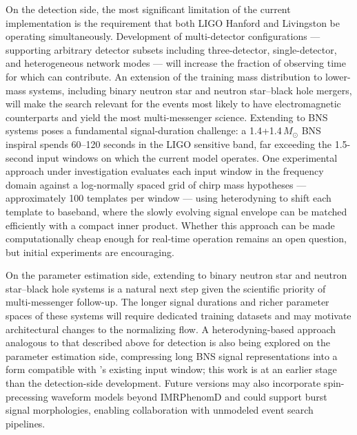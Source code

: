 On the detection side, the most significant limitation of the current \aframe implementation is the requirement that both LIGO Hanford and Livingston be operating simultaneously.
Development of multi-detector configurations --- supporting arbitrary detector subsets including three-detector, single-detector, and heterogeneous network modes --- will increase the fraction of observing time for which \aframe can contribute.
An extension of the training mass distribution to lower-mass systems, including binary neutron star and neutron star--black hole mergers, will make the search relevant for the events most likely to have electromagnetic counterparts and yield the most multi-messenger science.
Extending \aframe to BNS systems poses a fundamental signal-duration challenge: a 1.4+1.4\,$M_\odot$ BNS inspiral spends 60--120 seconds in the LIGO sensitive band, far exceeding the 1.5-second input windows on which the current model operates.
One experimental approach under investigation evaluates each input window in the frequency domain against a log-normally spaced grid of chirp mass hypotheses --- approximately 100 templates per window --- using heterodyning to shift each template to baseband, where the slowly evolving signal envelope can be matched efficiently with a compact inner product.
Whether this approach can be made computationally cheap enough for real-time operation remains an open question, but initial experiments are encouraging.

On the parameter estimation side, extending \amplfi to binary neutron star and neutron star--black hole systems is a natural next step given the scientific priority of multi-messenger follow-up.
The longer signal durations and richer parameter spaces of these systems will require dedicated training datasets and may motivate architectural changes to the normalizing flow.
A heterodyning-based approach analogous to that described above for detection is also being explored on the parameter estimation side, compressing long BNS signal representations into a form compatible with \amplfi's existing input window; this work is at an earlier stage than the detection-side development.
Future versions may also incorporate spin-precessing waveform models beyond IMRPhenomD and could support burst signal morphologies, enabling collaboration with unmodeled event search pipelines.

